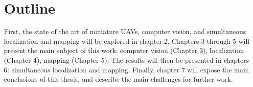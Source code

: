 \section{Outline}
First, the state of the art of miniature UAVs, computer vision, and simultaneous localization and mapping will be explored in chapter 2. Chapters 3 through 5 will present the main subject of this work: computer vision (Chapter 3), localization (Chapter 4), mapping (Chapter 5). The results will then be presented in chapters 6: simultaneous localization and mapping. Finally, chapter 7 will expose the main conclusions of this thesis, and describe the main challenges for further work.
